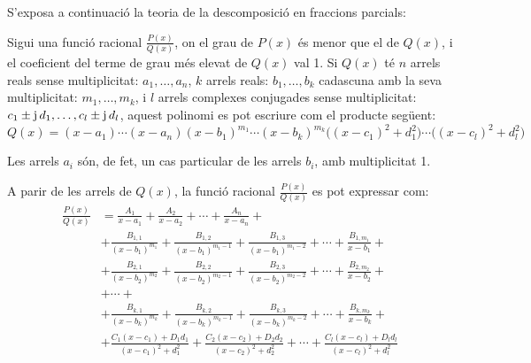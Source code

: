 S'exposa a continuaci\'{o} la teoria de la descomposici\'{o} en fraccions
parcials:

Sigui una funci\'{o} racional $\frac{P(x)}{Q(x)}$, on el grau de $P(x)$
\'{e}s menor que el de $Q(x)$, i el coeficient del terme de grau m\'{e}s
elevat de $Q(x)$ val 1. Si $Q(x)$ t\'{e} $n$ arrels reals sense
multiplicitat: $a_1,\ldots,a_n$, $k$ arrels reals: $b_1,\ldots,b_k$
cadascuna amb la seva multiplicitat: $m_1,\ldots,m_k$, i $l$ arrels
complexes conjugades sense multiplicitat: $c_1\pm
\mathrm{j}\,d_1,\ldots,c_l\pm \mathrm{j}\,d_l$, aquest polinomi es pot escriure
com el producte seg\"{u}ent:
\begin{equation}
    Q(x)= (x-a_1) \cdots (x-a_n)(x-b_1)^{m_1} \cdots (x-b_k)^{m_k}
    \bigl((x-c_1)^2+d_1^2\bigr)\cdots\bigl((x-c_l)^2+d_l^2\bigr)
\end{equation}

Les arrels $a_i$ s\'{o}n, de fet, un cas particular de les arrels $b_i$,
amb multiplicitat 1.

A parir de les arrels de $Q(x)$, la funci\'{o}  racional
$\frac{P(x)}{Q(x)}$ es pot expressar com:
\begin{equation}\begin{split}
    \frac{P(x)}{Q(x)} &= \frac{A_1}{x-a_1} + \frac{A_2}{x-a_2}
    + \cdots + \frac{A_n}{x-a_n} +{} \\[1.5ex]
   &+ \frac{B_{1,1}}{(x-b_1)^{m_1}} + \frac{B_{1,2}}{(x-b_1)^{m_1-1}}
   + \frac{B_{1,3}}{(x-b_1)^{m_1-2}} + \cdots +
   \frac{B_{1,m_1}}{x-b_1}+{} \\[1.5ex]
&+ \frac{B_{2,1}}{(x-b_2)^{m_2}} + \frac{B_{2,2}}{(x-b_2)^{m_2-1}}
   + \frac{B_{2,3}}{(x-b_2)^{m_2-2}} + \cdots  +
   \frac{B_{2,m_2}}{x-b_2} +{}\\[1.5ex]
   &+ \cdots +\\[1ex]
&+ \frac{B_{k,1}}{(x-b_k)^{m_k}} + \frac{B_{k,2}}{(x-b_k)^{m_k-1}}
   + \frac{B_{k,3}}{(x-b_k)^{m_k-2}} + \cdots +
   \frac{B_{k,m_k}}{x-b_k}+{}\\[1.5ex]
&+ \frac{C_1(x-c_1)+D_1 d_1}{(x-c_1)^2+d_1^2}+ \frac{C_2(x-c_2)+D_2
d_2}{(x-c_2)^2+d_2^2} +  \cdots +\frac{C_l(x-c_l)+D_l d_l}{(x-c_l)^2+d_l^2}\\[1.5ex]
\end{split}\end{equation}

